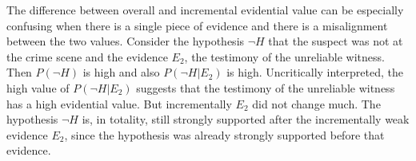 \documentclass[10pt]{article}
\begin{document}
The difference between overall and incremental evidential value can be especially confusing when there is a single piece of evidence and there is a misalignment between the two values. Consider the hypothesis $\neg H$ that the suspect was not at the crime scene and the evidence $E_2$, the testimony of the unreliable witness. Then $P(\neg H)$ is high and also $P(\neg H | E_2)$ is high. Uncritically interpreted, the high value of $P(\neg H | E_2)$ suggests that the testimony of the unreliable witness has a high evidential value. But incrementally $E_2$ did not change much. The hypothesis $\neg H$ is, in totality, still strongly supported after the incrementally weak evidence $E_2$, since the hypothesis was already strongly supported before that evidence. 

%
%
%
%
\end{document}
